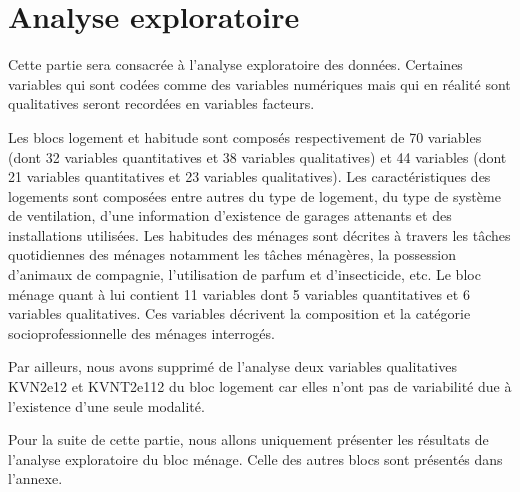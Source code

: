 \documentclass[11pt,a4paper, x11names]{article}\usepackage[]{graphicx}\usepackage[]{color}
\begin{document}
\section{Analyse exploratoire }
Cette partie sera consacrée à l'analyse exploratoire des données.
Certaines variables qui sont codées comme des variables numériques mais qui en réalité sont qualitatives seront recordées en variables facteurs.\par
Les blocs logement et habitude sont composés respectivement de 70 variables (dont 32 variables quantitatives et 38 variables qualitatives) et 44 variables (dont 21 variables quantitatives et 23 variables qualitatives). Les caractéristiques des logements sont composées entre autres du type de logement, du type de système de ventilation, d'une information d'existence de garages attenants et des installations utilisées. Les habitudes des ménages sont décrites à travers les tâches quotidiennes des ménages notamment les tâches ménagères, la possession d'animaux de compagnie, l'utilisation de parfum et d'insecticide, etc. Le bloc ménage quant à lui contient 11 variables dont 5 variables quantitatives et 6 variables qualitatives. Ces variables décrivent la composition et la catégorie socioprofessionnelle des ménages interrogés. \par
Par ailleurs, nous avons supprimé de l'analyse deux variables qualitatives KVN2e12 et KVNT2e112 du bloc logement car elles n'ont pas de variabilité due à l'existence d'une seule modalité.\par
Pour la suite de cette partie, nous allons uniquement présenter les résultats de l'analyse exploratoire du bloc ménage. Celle des autres blocs sont présentés dans l'annexe.

\end{document}
